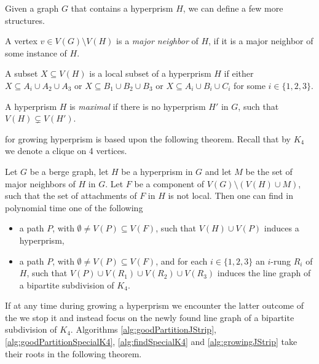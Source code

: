 Given a graph $G$ that contains a hyperprism $H$, we can define a few more structures.

\begin{defnTwo}
  A vertex $v \in V(G) \setminus V(H)$ is a \emph{major neighbor} of $H$, if it is a major neighbor of some instance of $H$.
\end{defnTwo}

\begin{defnTwo}
  A subset $X \subseteq V(H)$ is a local subset of a hyperprism $H$ if either $X \subseteq A_i \cup A_2 \cup A_3$ or $X \subseteq B_1 \cup B_2 \cup B_3$ or $X \subseteq A_i \cup B_i \cup C_i$ for some $i \in \{1, 2, 3\}$.
\end{defnTwo}

\begin{defnTwo}
  A hyperprism $H$ is \emph{maximal} if there is no hyperprism $H'$ in $G$, such that $V(H) \varsubsetneq V(H')$.
\end{defnTwo}




 for growing hyperprism is based upon the following theorem. Recall that by $K_4$ we denote a clique on 4 vertices.
\begin{theorem}
  Let $G$ be a berge graph, let $H$ be a hyperprism in $G$ and let $M$ be the set of major neighbors of $H$ in $G$. Let $F$ be a component of $V(G) \setminus(V(H) \cup M)$, such that the set of attachments of $F$ in $H$ is not local. Then one can find in polynomial time one of the following
  \begin{itemize}
    \item a path $P$, with $\emptyset \neq V(P) \subseteq V(F)$, such that $V(H) \cup V(P)$ induces a hyperprism,
    \item a path $P$, with $\emptyset \neq V(P) \subseteq V(F)$, and for each $i \in \{1, 2, 3\}$ an $i$-rung $R_i$ of $H$, such that $V(P) \cup V(R_1) \cup V(R_2) \cup V(R_3)$ induces the line graph of a bipartite subdivision of $K_4$.
  \end{itemize}
  \label{thm:growingHyperprism}
\end{theorem}

If at any time during growing a hyperprism we encounter the latter outcome of the  we stop it and instead focus on the newly found line graph of a bipartite subdivision of $K_4$. Algorithms \ref{alg:goodPartitionJStrip}, \ref{alg:goodPartitionSpecialK4}, \ref{alg:findSpecialK4} and \ref{alg:growingJStrip} take their roots in the following theorem.

